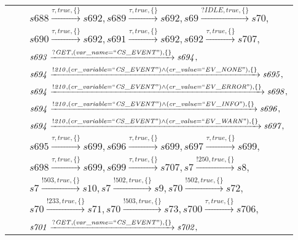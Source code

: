\begin{tabular}{lcp{350px}}
& & $\mathit{s688}\xrightarrow{\mathit{\tau}, \mathit{true}, \{\}}\mathit{s692},\mathit{s689}\xrightarrow{\mathit{\tau}, \mathit{true}, \{\}}\mathit{s692},\mathit{s69}\xrightarrow{\mathit{?IDLE}, \mathit{true}, \{\}}\mathit{s70},$ \\
& & $\mathit{s690}\xrightarrow{\mathit{\tau}, \mathit{true}, \{\}}\mathit{s692},\mathit{s691}\xrightarrow{\mathit{\tau}, \mathit{true}, \{\}}\mathit{s692},\mathit{s692}\xrightarrow{\mathit{\tau}, \mathit{true}, \{\}}\mathit{s707},$ \\
& & $\mathit{s693}\xrightarrow{\mathit{?GET}, \mathit{(var\_name = ``CS\_EVENT")}, \{\}}\mathit{s694},$ \\
& & $\mathit{s694}\xrightarrow{\mathit{!210}, \mathit{(cr\_variable = ``CS\_EVENT") \land (cr\_value = ``EV\_NONE")}, \{\}}\mathit{s695},$ \\
& & $\mathit{s694}\xrightarrow{\mathit{!210}, \mathit{(cr\_variable = ``CS\_EVENT") \land (cr\_value = ``EV\_ERROR")}, \{\}}\mathit{s698},$ \\
& & $\mathit{s694}\xrightarrow{\mathit{!210}, \mathit{(cr\_variable = ``CS\_EVENT") \land (cr\_value = ``EV\_INFO")}, \{\}}\mathit{s696},$ \\
& & $\mathit{s694}\xrightarrow{\mathit{!210}, \mathit{(cr\_variable = ``CS\_EVENT") \land (cr\_value = ``EV\_WARN")}, \{\}}\mathit{s697},$ \\
& & $\mathit{s695}\xrightarrow{\mathit{\tau}, \mathit{true}, \{\}}\mathit{s699},\mathit{s696}\xrightarrow{\mathit{\tau}, \mathit{true}, \{\}}\mathit{s699},\mathit{s697}\xrightarrow{\mathit{\tau}, \mathit{true}, \{\}}\mathit{s699},$ \\
& & $\mathit{s698}\xrightarrow{\mathit{\tau}, \mathit{true}, \{\}}\mathit{s699},\mathit{s699}\xrightarrow{\mathit{\tau}, \mathit{true}, \{\}}\mathit{s707},\mathit{s7}\xrightarrow{\mathit{!250}, \mathit{true}, \{\}}\mathit{s8},$ \\
& & $\mathit{s7}\xrightarrow{\mathit{!503}, \mathit{true}, \{\}}\mathit{s10},\mathit{s7}\xrightarrow{\mathit{!502}, \mathit{true}, \{\}}\mathit{s9},\mathit{s70}\xrightarrow{\mathit{!502}, \mathit{true}, \{\}}\mathit{s72},$ \\
& & $\mathit{s70}\xrightarrow{\mathit{!233}, \mathit{true}, \{\}}\mathit{s71},\mathit{s70}\xrightarrow{\mathit{!503}, \mathit{true}, \{\}}\mathit{s73},\mathit{s700}\xrightarrow{\mathit{\tau}, \mathit{true}, \{\}}\mathit{s706},$ \\
& & $\mathit{s701}\xrightarrow{\mathit{?GET}, \mathit{(var\_name = ``CS\_EVENT")}, \{\}}\mathit{s702},$ \\

\end{tabular}
